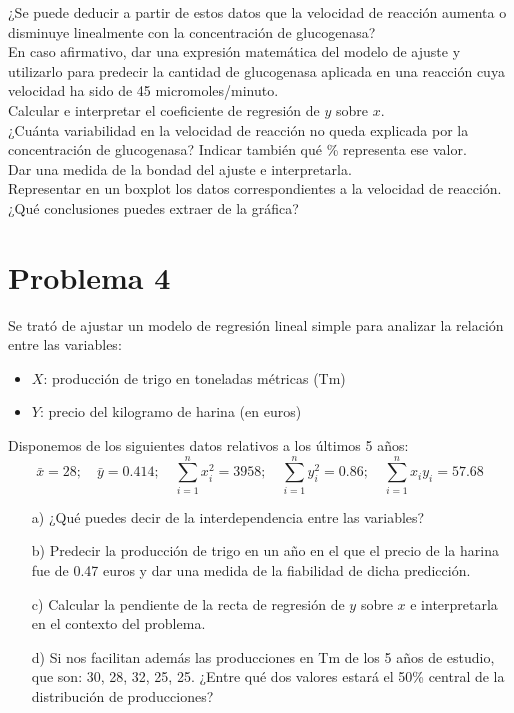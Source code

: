 \documentclass[fleqn]{article}
\begin{document}
	¿Se puede deducir a partir de estos datos que la velocidad de reacción aumenta o disminuye linealmente con la concentración de glucogenasa? \\
	En caso afirmativo, dar una expresión matemática del modelo de ajuste y utilizarlo para predecir la cantidad de glucogenasa aplicada en una reacción cuya velocidad ha sido de 45 micromoles/minuto. \\
	Calcular e interpretar el coeficiente de regresión de \( y \) sobre \( x \). \\
	¿Cuánta variabilidad en la velocidad de reacción no queda explicada por la concentración de glucogenasa? Indicar también qué \% representa ese valor. \\
	Dar una medida de la bondad del ajuste e interpretarla. \\
	Representar en un boxplot los datos correspondientes a la velocidad de reacción. ¿Qué conclusiones puedes extraer de la gráfica?
	\section{Problema 4}
	Se trató de ajustar un modelo de regresión lineal simple para analizar la relación entre las variables:
	\begin{itemize}
		\item \( X \): producción de trigo en toneladas métricas (Tm)
		\item \( Y \): precio del kilogramo de harina (en euros)
	\end{itemize}
	Disponemos de los siguientes datos relativos a los últimos 5 años:
	\[
	\bar{x} = 28; \quad \bar{y} = 0.414; \quad \sum_{i=1}^n x_i^2 = 3958; \quad \sum_{i=1}^n y_i^2 = 0.86; \quad \sum_{i=1}^n x_i y_i = 57.68
	\]
	\begin{enumerate}
		\item[a)] ¿Qué puedes decir de la interdependencia entre las variables?
		\item[b)] Predecir la producción de trigo en un año en el que el precio de la harina fue de 0.47 euros y dar una medida de la fiabilidad de dicha predicción.
		\item[c)] Calcular la pendiente de la recta de regresión de \( y \) sobre \( x \) e interpretarla en el contexto del problema.
		\item[d)] Si nos facilitan además las producciones en Tm de los 5 años de estudio, que son: 30, 28, 32, 25, 25. ¿Entre qué dos valores estará el 50\% central de la distribución de producciones?
	\end{enumerate}
\end{document}
